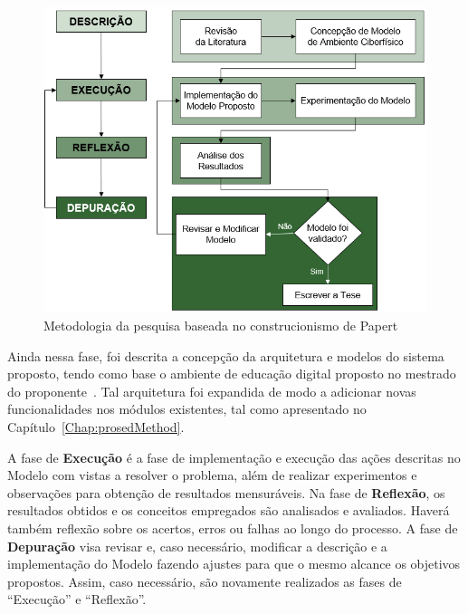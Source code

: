 \begin{figure}[ht]
	\centering
	\includegraphics[width=0.8\linewidth]{imgs/METODOLOGIA_v2.png}
	\caption{Metodologia da pesquisa baseada no construcionismo de Papert}
	\label{fig:metodologia}
\end{figure}


Ainda nessa fase, foi descrita a concepção da arquitetura e modelos do sistema proposto, tendo como base o ambiente de educação digital proposto no mestrado do proponente~\citep{leitao:2017}. Tal arquitetura foi expandida de modo a adicionar novas funcionalidades nos módulos existentes, tal como apresentado no Capítulo~\ref{Chap:prosedMethod}.

A fase de \textbf{Execução} é a fase de implementação e execução das ações descritas no Modelo com vistas a resolver o problema, além de realizar experimentos e observações para obtenção de resultados mensuráveis. Na fase de \textbf{Reflexão}, os resultados obtidos e os conceitos empregados são analisados e avaliados. Haverá também reflexão sobre os acertos, erros ou falhas ao longo do processo. A fase de \textbf{Depuração} visa revisar e, caso necessário, modificar a descrição e a implementação do Modelo fazendo ajustes para que o mesmo alcance os objetivos propostos. Assim, caso necessário, são novamente realizados as fases de ``Execução'' e ``Reflexão''.

